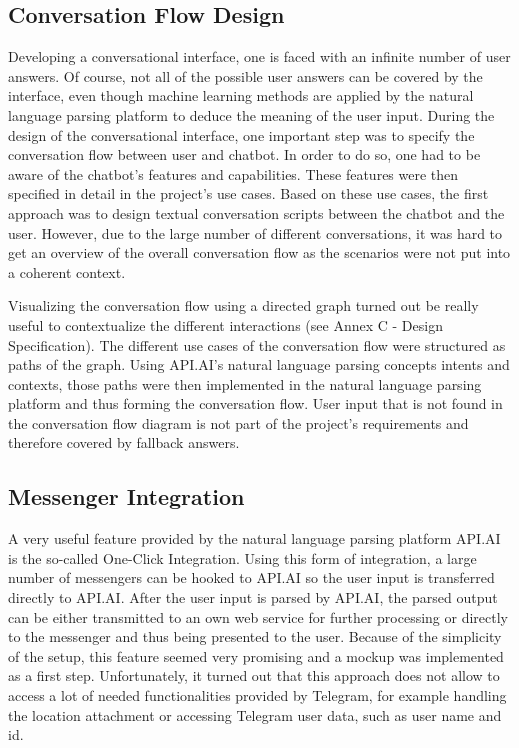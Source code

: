 \subsection{Conversation Flow Design}
Developing a conversational interface, one is faced with an infinite number of user answers. Of course, not all of the possible user answers can be covered by the interface, even though machine learning methods are applied by the natural language parsing platform to deduce the meaning of the user input. During the design of the conversational interface, one important step was to specify the conversation flow between user and chatbot. In order to do so, one had to be aware of the chatbot’s features and capabilities. These features were then specified in detail in the project’s use cases.
Based on these use cases, the first approach was to design textual conversation scripts between the chatbot and the user. However, due to the large number of different conversations, it was hard to get an overview of the overall conversation flow as the scenarios were not put into a coherent context.

Visualizing the conversation flow using a directed graph turned out be really useful to contextualize the different interactions (see Annex C - Design Specification). The different use cases of the conversation flow were structured as paths of the graph. Using API.AI’s natural language parsing concepts intents and contexts, those paths were then implemented in the natural language parsing platform and thus forming the conversation flow. User input that is not found in the conversation flow diagram is not part of the project’s requirements and therefore covered by fallback answers.

\subsection{Messenger Integration}
A very useful feature provided by the natural language parsing platform API.AI is the so-called One-Click Integration. Using this form of integration, a large number of messengers can be hooked to API.AI so the user input is transferred directly to API.AI. After the user input is parsed by API.AI, the parsed output can be either transmitted to an own web service for further processing or directly to the messenger and thus being presented to the user. Because of the simplicity of the setup, this feature seemed very promising and a mockup was implemented as a first step. Unfortunately, it turned out that this approach does not allow to access a lot of needed functionalities provided by Telegram, for example handling the location attachment or accessing Telegram user data, such as user name and id. 

